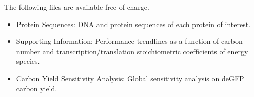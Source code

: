 \documentclass[journal=asbcd6,manuscript=article]{achemso}
\begin{document}
\begin{suppinfo}
The following files are available free of charge.
\begin{itemize}
  \item Protein Sequences: DNA and protein sequences of each protein of interest.
  \item Supporting Information: Performance trendlines as a function of carbon number and transcription/translation stoichiometric coefficients of energy species.
  \item Carbon Yield Sensitivity Analysis: Global sensitivity analysis on deGFP carbon yield.
\end{itemize}
\end{suppinfo}

\clearpage


\end{document}
